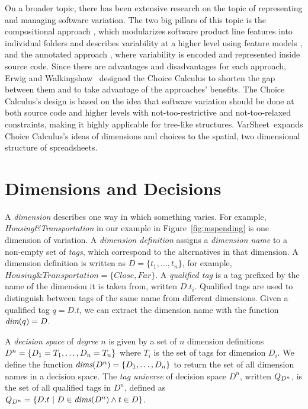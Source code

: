 \documentclass[conference]{IEEEtran}
\def\OB#1{\ifmmode#1\else\mbox{$#1$}\fi}
\newcommand{\set}[1]{\ensuremath{\{#1\}}}
\newcommand{\dimset}[1][D]{\OB{#1^n}}
\newcommand{\xdimSym}{\textit{dim}}
\newcommand{\xdim}[1]{\OB{\xdimSym(#1)}}
\newcommand{\dimsSym}{\textit{dims}}
\newcommand{\dims}[1]{\OB{\dimsSym(#1)}}
\newcommand{\decstr}{\OB{{\cal D}}}
\newcommand{\qt}[1][\decstr]{\OB{Q_{#1}}}
\newcommand{\varsheet}{VarSheet}
\newcommand{\mapname}[1]{\textit{#1}}
\newcommand{\htdim}{Housing\&Transportation}
\begin{document}
On a broader topic, there has been extensive research on the topic of representing and managing software variation. The two big pillars of this topic
is the compositional approach \cite{KA08}, which modularizes software product line features \cite{CN01} into individual folders and
describes variability at a higher level using feature models \cite{Bat05}, and the annotated approach \cite{KA08}, where variability is encoded
and represented inside source code. Since there are advantages and disadvantages for each approach, Erwig and Walkingshaw~\cite{EW11tosem}
designed the Choice Calculus to shorten the gap between them and to take advantage of the approaches' benefits. The Choice Calculus's design
is based on the idea that software variation should be done at both source code and higher
levels with not-too-restrictive and not-too-relaxed constraints, making it highly
applicable for tree-like structures. \varsheet~expands Choice Calculus's ideas of dimensions
and choices to the spatial, two dimensional structure of spreadsheets.

\section{Dimensions and Decisions}
\label{sec:dims}

A \emph{dimension} describes one way in which something varies.  For example,
\mapname{\htdim} in our example in Figure~\ref{fig:mspending} is one
dimension of variation.
%
A \emph{dimension definition} assigns a \emph{dimension name} to a non-empty
set of \emph{tags}, which correspond to the alternatives in that dimension.  A
dimension definition is written as $D=\set{t_1,\ldots,t_n}$, 
%
for example,
$\htdim=\set{Close, Far}$.
% 
A \emph{qualified tag} is a tag prefixed by the name of the dimension it is
taken from, written $D.t_i$. Qualified tags are used to distinguish between
tags of the same name from different dimensions. Given a qualified tag $q=D.t$,
we can extract the dimension name  with the function $\xdim{q}=D$.


A \emph{decision space} of \emph{degree} $n$ is given by a set of $n$
dimension definitions $\dimset = \set{D_1=T_1, \ldots, D_n=T_n}$ where $T_i$
is the set of tags for dimension $D_i$. 
%
We define the function $\dims{\dimset}=\set{D_1,\ldots,D_n}$ to return the set
of all dimension names in a decision space.
%
The \emph{tag universe} of decision space $D^n$, written $\qt[D^n]$, is the set
of all qualified tags in $D^n$, defined as 
$\qt[D^n]=\set{D.t\ |\ D\in\dims\dimset\wedge t\in D}$.
\end{document}
